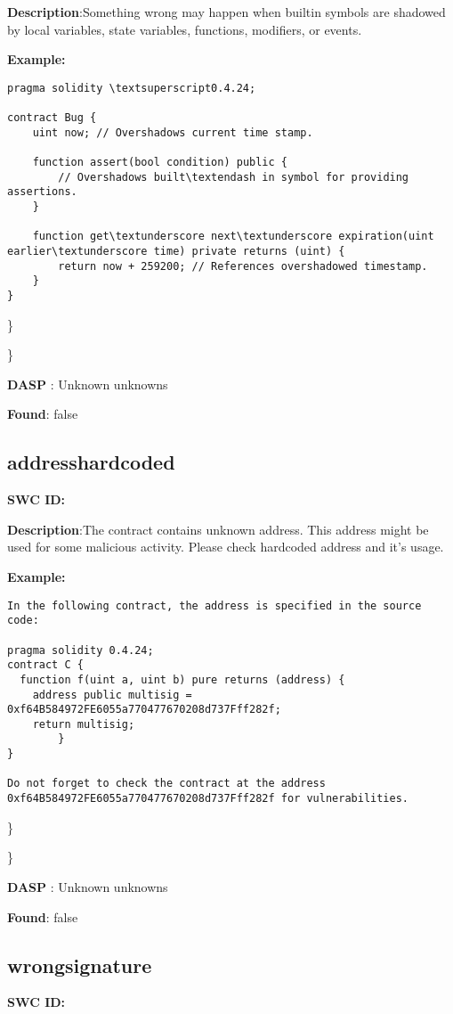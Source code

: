 \documentclass{article}
\begin{document}
\textbf{Description}:Something wrong may happen when built\textendash in symbols are shadowed by local variables, state variables, functions, modifiers, or events.


\textbf{Example:} 
\begin{verbatim}
pragma solidity \textsuperscript0.4.24;

contract Bug {
    uint now; // Overshadows current time stamp.

    function assert(bool condition) public {
        // Overshadows built\textendash in symbol for providing assertions.
    }

    function get\textunderscore next\textunderscore expiration(uint earlier\textunderscore time) private returns (uint) {
        return now + 259200; // References overshadowed timestamp.
    }
}

\end{verbatim}\} 

\} 

\textbf{DASP} : Unknown unknowns

\textbf{Found}: false

\subsection{address\textunderscore hardcoded} 
\textbf{SWC \textunderscore ID:} 

\textbf{Description}:The contract contains unknown address. This address might be used for some malicious activity. Please check hardcoded address and it's usage.


\textbf{Example:} 
\begin{verbatim}
In the following contract, the address is specified in the source code:

pragma solidity 0.4.24;
contract C {
  function f(uint a, uint b) pure returns (address) {
    address public multisig = 0xf64B584972FE6055a770477670208d737Fff282f;
    return multisig;
        }
}

Do not forget to check the contract at the address 0xf64B584972FE6055a770477670208d737Fff282f for vulnerabilities.

\end{verbatim}\} 

\} 

\textbf{DASP} : Unknown unknowns

\textbf{Found}: false

\subsection{wrong\textunderscore signature} 
\textbf{SWC \textunderscore ID:} 
\end{document}
